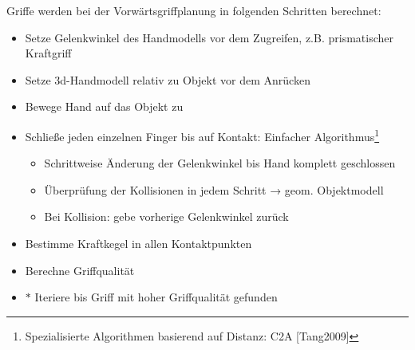 Griffe werden bei der Vorwärtsgriffplanung in folgenden Schritten berechnet:
\begin{itemize}
\item[1.] Setze Gelenkwinkel des Handmodells vor dem Zugreifen, z.B. prismatischer Kraftgriff
\item[2.] Setze 3d-Handmodell relativ zu Objekt vor dem Anrücken
\item[3.] Bewege Hand auf das Objekt zu
\item[4.] Schließe jeden einzelnen Finger bis auf Kontakt: Einfacher Algorithmus\footnote{Spezialisierte Algorithmen basierend auf Distanz: C2A [Tang2009]}
\begin{itemize}
\item[1.] Schrittweise Änderung der Gelenkwinkel bis Hand komplett geschlossen
\item[2.] Überprüfung der Kollisionen in jedem Schritt → geom. Objektmodell
\item[3.] Bei Kollision: gebe vorherige Gelenkwinkel zurück
\end{itemize}
\item[5.] Bestimme Kraftkegel in allen Kontaktpunkten
\item[6.] Berechne Griffqualität
\item[7.] $\ast$ Iteriere bis Griff mit hoher Griffqualität gefunden
\end{itemize}
